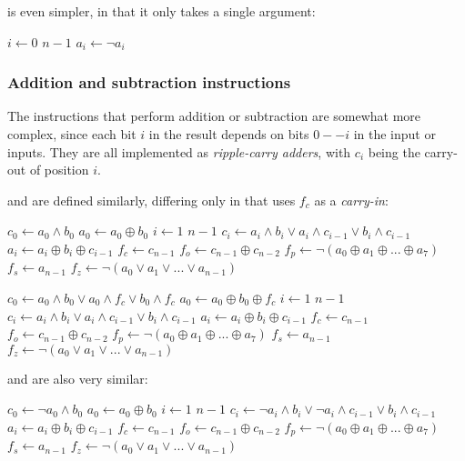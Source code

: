 \documentclass[a4paper,11pt]{kth-mag}
\renewcommand{\gets}{\leftarrow}
\newcommand{\AND}{\land}
\newcommand{\IOR}{\lor}
\newcommand{\XOR}{\oplus}
\newcommand{\NOT}{\lnot}
\begin{document}
 is even simpler, in that it only takes a single argument:

\begin{codebox}
\zi \For $i \gets 0$ \To $n-1$ \Do
\zi   $a_i \gets \NOT a_i$ \End
\end{codebox}

\subsubsection{Addition and subtraction instructions}

The instructions that perform addition or subtraction are somewhat more complex, since each bit $i$ in the result depends on bits $0--i$ in the input or inputs.
They are all implemented as \emph{ripple-carry adders}, with $c_i$ being the carry-out of position $i$.

 and  are defined similarly, differing only in that  uses $f_c$ as a \emph{carry-in}:

\begin{codebox}
\zi $c_0 \gets a_0 \AND b_0$
\zi $a_0 \gets a_0 \XOR b_0$
\zi \For $i \gets 1$ \To $n-1$ \Do
\zi   $c_i \gets a_i \AND b_i \IOR a_i \AND c_{i-1} \IOR b_i \AND c_{i-1}$
\zi   $a_i \gets a_i \XOR b_i \XOR c_{i-1}$ \End
\zi $f_c \gets c_{n-1}$
\zi $f_o \gets c_{n-1} \XOR c_{n-2}$
\zi $f_p \gets \NOT(a_0 \XOR a_1 \XOR ... \XOR a_7)$
\zi $f_s \gets a_{n-1}$
\zi $f_z \gets \NOT(a_0 \IOR a_1 \IOR ... \IOR a_{n-1})$
\end{codebox}

\begin{codebox}
\zi $c_0 \gets a_0 \AND b_0 \IOR a_0 \AND f_c \IOR b_0 \AND f_c$
\zi $a_0 \gets a_0 \XOR b_0 \XOR f_c$
\zi \For $i \gets 1$ \To $n-1$ \Do
\zi   $c_i \gets a_i \AND b_i \IOR a_i \AND c_{i-1} \IOR b_i \AND c_{i-1}$
\zi   $a_i \gets a_i \XOR b_i \XOR c_{i-1}$ \End
\zi $f_c \gets c_{n-1}$
\zi $f_o \gets c_{n-1} \XOR c_{n-2}$
\zi $f_p \gets \NOT(a_0 \XOR a_1 \XOR ... \XOR a_7)$
\zi $f_s \gets a_{n-1}$
\zi $f_z \gets \NOT(a_0 \IOR a_1 \IOR ... \IOR a_{n-1})$
\end{codebox}

 and  are also very similar:

\begin{codebox}
\zi $c_0 \gets \NOT a_0 \AND b_0$
\zi $a_0 \gets a_0 \XOR b_0$
\zi \For $i \gets 1$ \To $n-1$ \Do
\zi   $c_i \gets \NOT a_i \AND b_i \IOR \NOT a_i \AND c_{i-1} \IOR b_i \AND c_{i-1}$
\zi   $a_i \gets a_i \XOR b_i \XOR c_{i-1}$ \End
\zi $f_c \gets c_{n-1}$
\zi $f_o \gets c_{n-1} \XOR c_{n-2}$
\zi $f_p \gets \NOT(a_0 \XOR a_1 \XOR ... \XOR a_7)$
\zi $f_s \gets a_{n-1}$
\zi $f_z \gets \NOT(a_0 \IOR a_1 \IOR ... \IOR a_{n-1})$
\end{codebox}
\end{document}
